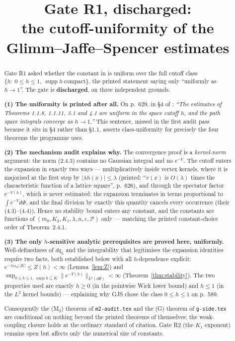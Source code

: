 \documentclass[11pt,a4paper]{article}
\title{Gate R1, discharged:\\ \large the cutoff-uniformity of the Glimm--Jaffe--Spencer estimates}
\author{}
\date{}
\theoremstyle{plain}
\theoremstyle{definition}
\DeclareMathOperator{\supp}{supp}
\begin{document}
\maketitle

\begin{abstract}
Gate R1 asked whether the constant in \cite[Thm.~1.1.8]{GJS} is uniform over the full cutoff
class $\{h:\ 0\le h\le1,\ \supp h\ \text{compact}\}$, the printed statement saying only
``uniformly as $h\to1$''. The gate is \textbf{discharged}, on three independent grounds.

\smallskip
\noindent\textbf{(1) The uniformity is printed after all.} On p.~629, in \S4 of \cite{GJS}:
\emph{``The estimates of Theorems 1.1.8, 1.1.11, 3.1 and 4.1 are uniform in the space cutoff
$h$, and the path space integrals converge as $h\to1$.''} This sentence, missed in the first
audit pass because it sits in \S4 rather than \S1.1, asserts class-uniformity for precisely the
four theorems the programme uses.

\smallskip
\noindent\textbf{(2) The mechanism audit explains why.} The convergence proof is a
\emph{kernel-norm} argument: the norm (2.4.3) contains no Gaussian integral and no $e^{-V}$. The
cutoff enters the expansion in exactly two ways --- multiplicatively inside vertex kernels, where
it is majorised at the first step by $|\lambda h(x)|\le\lambda$ (printed: ``$v(x)$ is $O(\lambda)$
times the characteristic function of a lattice square'', p.~626), and through the spectator
factor $e^{-V(h)}$, which is never estimated: the expansion terminates in terms proportional to
$\int e^{-V}d\Phi$, and the final division by exactly this quantity cancels every occurrence
(their (4.3)--(4.4)). Hence no stability bound enters any constant, and the constants are
functions of $(m_0,K_2,K_1,\lambda,n,\varepsilon,\mathscr P)$ only --- matching the printed
constant-choice order of Theorem~2.4.1.

\smallskip
\noindent\textbf{(3) The only $h$-sensitive analytic prerequisites are proved here, uniformly.}
Well-definedness of $dq_h$ and the integrability that legitimises the expansion identities
require two facts, both established below with all $h$-dependence explicit:
$e^{-\lambda|a_0|\,|K|}\le Z(h)<\infty$ (Lemma~\ref{lem:Z}) and
$\sup_{0\le h\le1,\ \supp h\subseteq K}\|e^{-V(h)}\|_{L^p(d\Phi)}<\infty$
(Theorem~\ref{thm:stability}). The two properties used are exactly $h\ge0$ (in the pointwise Wick
lower bound) and $h\le1$ (in the $L^2$ kernel bounds) --- explaining why GJS chose the class
$0\le h\le1$ on p.~589.

\smallskip
\noindent Consequently the (M$_2$) theorem of \texttt{m2-audit.tex} and the (G) theorem of
\texttt{g-side.tex} are conditional on nothing beyond the printed theorems of \cite{GJS}
themselves; the weak-coupling closure holds at the ordinary standard of citation. Gate R2
(the $K_1$ exponent) remains open but affects only the numerical size of constants.
\end{abstract}
\end{document}
